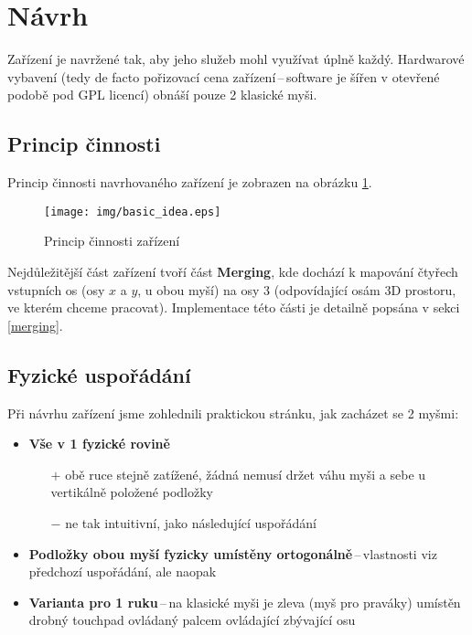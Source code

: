 
\section{Návrh}

Zařízení je navržené tak, aby jeho služeb mohl využívat úplně každý.
Hardwarové vybavení (tedy de facto pořizovací cena zařízení\,--\,software
je šířen v otevřené podobě pod GPL licencí) obnáší pouze 2 klasické myši.

\subsection{Princip činnosti}

Princip činnosti navrhovaného zařízení je zobrazen na obrázku \ref{fig:basicidea}.

\begin{figure}[htb]
\centering
\texttt{[image: img/basic\_idea.eps]}
\caption{Princip činnosti zařízení}
\label{fig:basicidea}
\end{figure}

Nejdůležitější část zařízení tvoří část {\bf Merging}, kde dochází k mapování
čtyřech vstupních os (osy $x$ a $y$, u obou myší) na osy 3 (odpovídající
osám 3D prostoru, ve kterém chceme pracovat). Implementace této části je
detailně popsána v sekci \ref{merging}.


\subsection{Fyzické uspořádání}

Při návrhu zařízení jsme zohlednili praktickou stránku, jak zacházet
se 2 myšmi:
\begin{itemize}
\item{{\bf Vše v 1 fyzické rovině}}
    \begin{itemize}
    \item[$+$]{ obě ruce stejně zatížené, žádná nemusí držet váhu myši a sebe u vertikálně položené podložky}
    \item[$-$]{ ne tak intuitivní, jako následující uspořádání}
    \end{itemize}
\item{{\bf Podložky obou myší fyzicky umístěny ortogonálně}\,--\,vlastnosti viz předchozí uspořádání, ale naopak}
\item{{\bf Varianta pro 1 ruku}\,--\,na klasické myši je zleva (myš pro praváky) umístěn drobný touchpad ovládaný palcem ovládající zbývající osu}
\end{itemize}


